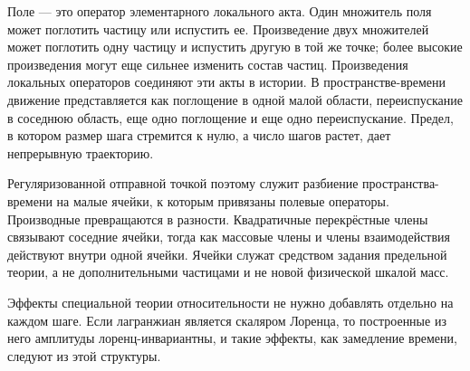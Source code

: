 Поле — это оператор элементарного локального акта. Один множитель поля может поглотить частицу или испустить ее. Произведение двух множителей может поглотить одну частицу и испустить другую в той же точке; более высокие произведения могут еще сильнее изменить состав частиц. Произведения локальных операторов соединяют эти акты в истории. В пространстве-времени движение представляется как поглощение в одной малой области, переиспускание в соседнюю область, еще одно поглощение и еще одно переиспускание. Предел, в котором размер шага стремится к нулю, а число шагов растет, дает непрерывную траекторию.

\begin{classroomqa}
\end{classroomqa}

Регуляризованной отправной точкой поэтому служит разбиение пространства-времени на малые ячейки, к которым привязаны полевые операторы. Производные превращаются в разности. Квадратичные перекрёстные члены связывают соседние ячейки, тогда как массовые члены и члены взаимодействия действуют внутри одной ячейки. Ячейки служат средством задания предельной теории, а не дополнительными частицами и не новой физической шкалой масс.

Эффекты специальной теории относительности не нужно добавлять отдельно на каждом шаге. Если лагранжиан является скаляром Лоренца, то построенные из него амплитуды лоренц-инвариантны, и такие эффекты, как замедление времени, следуют из этой структуры.

\begin{classroomqa}
\end{classroomqa}

